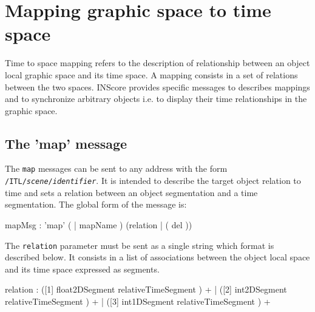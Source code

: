 \documentclass[a4paper,twoside]{report}
\newcommand{\toplevel}[1]	{\chapter{#1}}
\newcommand{\sublevel}[1]	{\section{#1}}
\newcommand{\OSC}[1]		{\texttt{#1}}
\begin{document}

\toplevel{Mapping graphic space to time space}
\label{mapping}

Time to space mapping refers to the description of relationship between an object local graphic space and its time space. A mapping consists in a set of relations between the two spaces. INScore provides specific messages to describes mappings and to synchronize arbitrary objects i.e. to display their time relationships in the graphic space.

\sublevel{The 'map' message}
\label{mapMsg}

The \OSC{map} messages can be sent to any address with the form \OSC{/ITL/\textit{scene}/\textit{identifier}}. It is intended to describe the target object relation to time and sets a relation between an object segmentation and a time segmentation. 
The global form of the message is:

\begin{rail}
mapMsg : 'map' ( | mapName ) (relation	|	( del ))
\end{rail}

The \OSC{relation} parameter must be sent as a single string which format is described below. It consists in a list of associations between the object local space and its time space expressed as segments.

\begin{rail}
relation : 
		([1] float2DSegment relativeTimeSegment ) +
	| 	([2] int2DSegment relativeTimeSegment ) +
	| 	([3] int1DSegment relativeTimeSegment ) + 
\end{rail}
\end{document}
